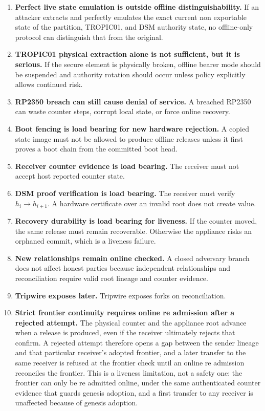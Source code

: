\documentclass[11pt]{article}
\theoremstyle{definition}
\theoremstyle{remark}
\begin{document}
\begin{enumerate}[label=(\arabic*),leftmargin=2em]
\item \textbf{Perfect live state emulation is outside offline distinguishability.}
If an attacker extracts and perfectly emulates the exact current non exportable state of the
partition, TROPIC01, and DSM authority state, no offline-only protocol can distinguish that from
the original.

\item \textbf{TROPIC01 physical extraction alone is not sufficient, but it is serious.}
If the secure element is physically broken, offline bearer mode should be suspended and authority
rotation should occur unless policy explicitly allows continued risk.

\item \textbf{RP2350 breach can still cause denial of service.}
A breached RP2350 can waste counter steps, corrupt local state, or force online recovery.

\item \textbf{Boot fencing is load bearing for new hardware rejection.}
A copied state image must not be allowed to produce offline releases unless it first proves a boot
chain from the committed boot head.

\item \textbf{Receiver counter evidence is load bearing.}
The receiver must not accept host reported counter state.

\item \textbf{DSM proof verification is load bearing.}
The receiver must verify \(h_i\rightarrow h_{i+1}\). A hardware certificate over an invalid root
does not create value.

\item \textbf{Recovery durability is load bearing for liveness.}
If the counter moved, the same release must remain recoverable. Otherwise the appliance risks an
orphaned commit, which is a liveness failure.

\item \textbf{New relationships remain online checked.}
A closed adversary branch does not affect honest parties because independent relationships and
reconciliation require valid root lineage and counter evidence.

\item \textbf{Tripwire exposes later.}
Tripwire exposes forks on reconciliation.

\item \textbf{Strict frontier continuity requires online re admission after a rejected attempt.}
The physical counter and the appliance root advance when a release is produced, even if the
receiver ultimately rejects that confirm. A rejected attempt therefore opens a gap between the
sender lineage and that particular receiver's adopted frontier, and a later transfer to the same
receiver is refused at the frontier check until an online re admission reconciles the frontier.
This is a liveness limitation, not a safety one: the frontier can only be re admitted online,
under the same authenticated counter evidence that guards genesis adoption, and a first transfer
to any receiver is unaffected because of genesis adoption.
\end{enumerate}
\end{document}
